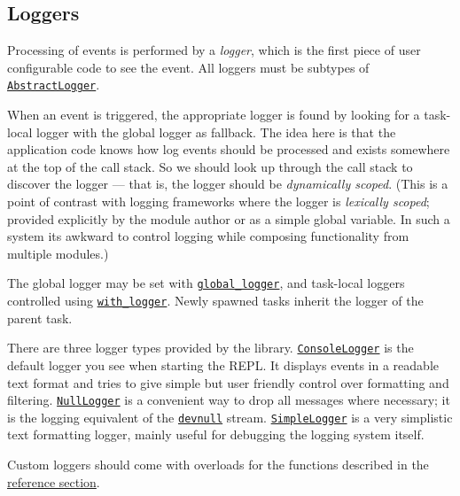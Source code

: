 \hypertarget{9118034371113309221}{}


\subsection{Loggers}



Processing of events is performed by a \emph{logger}, which is the first piece of user configurable code to see the event. All loggers must be subtypes of \hyperlink{16983066617679297643}{\texttt{AbstractLogger}}.



When an event is triggered, the appropriate logger is found by looking for a task-local logger with the global logger as fallback.  The idea here is that the application code knows how log events should be processed and exists somewhere at the top of the call stack. So we should look up through the call stack to discover the logger — that is, the logger should be \emph{dynamically scoped}. (This is a point of contrast with logging frameworks where the logger is \emph{lexically scoped}; provided explicitly by the module author or as a simple global variable. In such a system it{\textquotesingle}s awkward to control logging while composing functionality from multiple modules.)



The global logger may be set with \hyperlink{4306559652149699055}{\texttt{global\_logger}}, and task-local loggers controlled using \hyperlink{14383079235362132941}{\texttt{with\_logger}}.  Newly spawned tasks inherit the logger of the parent task.



There are three logger types provided by the library.  \hyperlink{14105182192150729642}{\texttt{ConsoleLogger}} is the default logger you see when starting the REPL.  It displays events in a readable text format and tries to give simple but user friendly control over formatting and filtering.  \hyperlink{15508205197393226825}{\texttt{NullLogger}} is a convenient way to drop all messages where necessary; it is the logging equivalent of the \hyperlink{13412111234074215621}{\texttt{devnull}} stream.  \hyperlink{206724342092815568}{\texttt{SimpleLogger}} is a very simplistic text formatting logger, mainly useful for debugging the logging system itself.



Custom loggers should come with overloads for the functions described in the \hyperlink{8132992094414010061}{reference section}.



